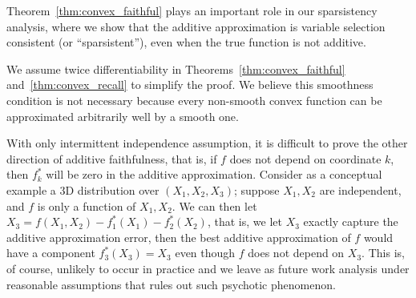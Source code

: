Theorem~\ref{thm:convex_faithful} plays an important role in our
sparsistency analysis, where we show that the additive
approximation is variable selection consistent (or ``sparsistent''), even when the true function is not
additive.

\begin{remark}
  We assume twice differentiability in
  Theorems~\ref{thm:convex_faithful} and~\ref{thm:convex_recall} to simplify the proof. 
  We believe
  this smoothness condition is not necessary because every non-smooth
  convex function can be approximated arbitrarily well by a smooth
  one.  
\end{remark}

\begin{remark}
With only intermittent independence assumption, it is difficult to prove the other direction of additive faithfulness, that is, if $f$ does not depend on coordinate $k$, then $f_k^*$ will be zero in the additive approximation. Consider as a conceptual example a 3D distribution over $(X_1, X_2, X_3)$; suppose $X_1, X_2$ are independent, and $f$ is only a function of $X_1, X_2$. We can then let $X_3 = f(X_1, X_2) - f^*_1(X_1) - f^*_2(X_2)$, that is, we let $X_3$ exactly capture the additive approximation error, then the best additive approximation of $f$ would have a component $f^*_3(X_3) = X_3$ even though $f$ does not depend on $X_3$. This is, of course, unlikely to occur in practice and we leave as future work analysis under reasonable assumptions that rules out such psychotic phenomenon. 
\end{remark}



 

